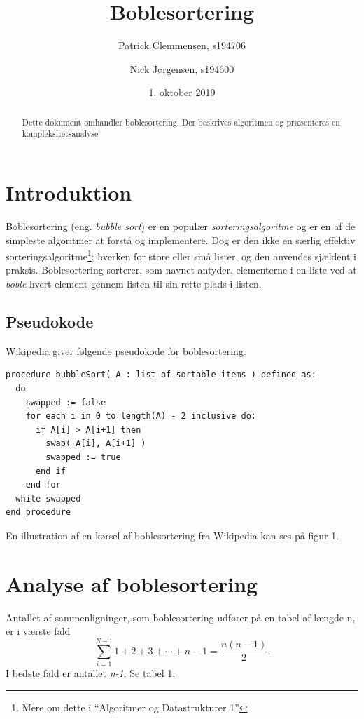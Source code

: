 \documentclass{article}
\title{\huge Boblesortering}
\author{Patrick Clemmensen, s194706 \and Nick Jørgensen, s194600}
\date{1. oktober 2019}
\begin{document}
\maketitle



\begin{abstract}
Dette dokument omhandler boblesortering. Der beskrives algoritmen og præsenteres en kompleksitetsanalyse
\end{abstract}

\section{Introduktion}
Boblesortering (eng. \textit{bubble sort}) er en populær \textit{sorteringsalgoritme} og er en af de simpleste algoritmer at forstå og implementere. Dog er den ikke en særlig effektiv sorteringsalgoritme\footnote[1]{Mere om dette i “Algoritmer og Datastrukturer 1”}; hverken for store eller små lister, og den anvendes sjældent i praksis. Boblesortering sorterer, som navnet antyder, elementerne i en liste ved at \textit{boble} hvert element gennem listen til sin rette plads i listen.

\subsection{Pseudokode}
Wikipedia {\cite{2}} giver følgende pseudokode for boblesortering.

\begin{verbatim}
procedure bubbleSort( A : list of sortable items ) defined as:
  do
    swapped := false
    for each i in 0 to length(A) - 2 inclusive do:
      if A[i] > A[i+1] then
        swap( A[i], A[i+1] )
        swapped := true
      end if
    end for
  while swapped
end procedure
\end{verbatim}
En illustration af en kørsel af boblesortering fra Wikipedia kan ses på figur 1.


\section{Analyse af boblesortering}
Antallet af sammenligninger, som boblesortering udfører på en tabel af længde n, er i værste fald
\begin{equation}
  \sum \limits_{i = 1}^{N-1} 1+2+3+\cdots+n-1 = \frac{n(n-1)}{2}.
\end{equation}
I bedste fald er antallet \textit{n-1}. Se tabel 1.
\newpage
\end{document}
